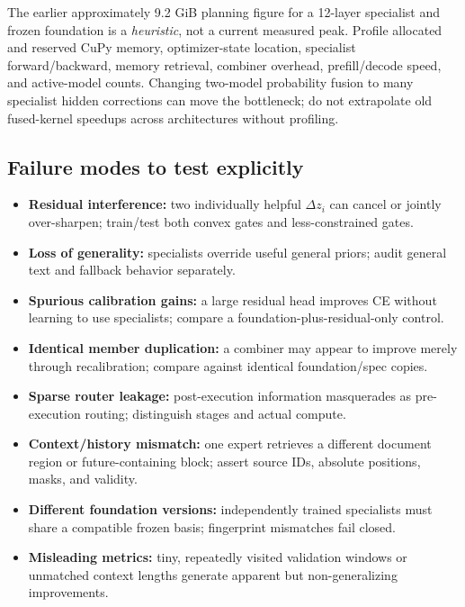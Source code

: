 \documentclass[11pt,letterpaper]{article}
\begin{document}
The earlier approximately 9.2 GiB planning figure for a 12-layer specialist and frozen foundation is a \emph{heuristic}, not a current measured peak. Profile allocated and reserved CuPy memory, optimizer-state location, specialist forward/backward, memory retrieval, combiner overhead, prefill/decode speed, and active-model counts. Changing two-model probability fusion to many specialist hidden corrections can move the bottleneck; do not extrapolate old fused-kernel speedups across architectures without profiling.

\subsection{Failure modes to test explicitly}
\begin{itemize}
\item \textbf{Residual interference:} two individually helpful $\Delta z_i$ can cancel or jointly over-sharpen; train/test both convex gates and less-constrained gates.
\item \textbf{Loss of generality:} specialists override useful general priors; audit general text and fallback behavior separately.
\item \textbf{Spurious calibration gains:} a large residual head improves CE without learning to use specialists; compare a foundation-plus-residual-only control.
\item \textbf{Identical member duplication:} a combiner may appear to improve merely through recalibration; compare against identical foundation/spec copies.
\item \textbf{Sparse router leakage:} post-execution information masquerades as pre-execution routing; distinguish stages and actual compute.
\item \textbf{Context/history mismatch:} one expert retrieves a different document region or future-containing block; assert source IDs, absolute positions, masks, and validity.
\item \textbf{Different foundation versions:} independently trained specialists must share a compatible frozen basis; fingerprint mismatches fail closed.
\item \textbf{Misleading metrics:} tiny, repeatedly visited validation windows or unmatched context lengths generate apparent but non-generalizing improvements.
\end{itemize}
\end{document}
